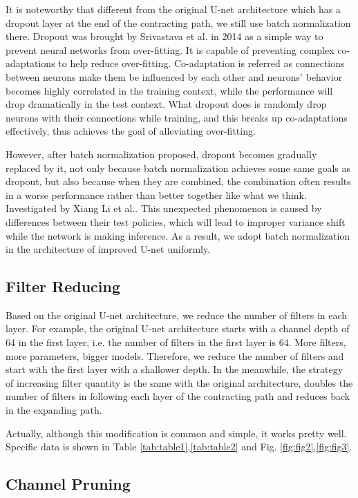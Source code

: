\documentclass[sigconf]{acmart}
\begin{document}
It is noteworthy that different from the original U-net architecture which has a dropout layer at the end of the contracting path, we still use batch normalization there. Dropout was brought by Srivastava et al. in 2014 \cite{dropout} as a simple way to prevent neural networks from over-fitting. It is capable of preventing complex co-adaptations to help reduce over-fitting. Co-adaptation is referred as connections between neurons make them be influenced by each other and neurons' behavior becomes highly correlated in the training context, while the performance will drop dramatically in the test context. What dropout does is randomly drop neurons with their connections while training, and this breaks up co-adaptations effectively, thus achieves the goal of alleviating over-fitting.

However, after batch normalization proposed, dropout becomes gradually replaced by it, not only because batch normalization achieves some same goals as dropout, but also because when they are combined, the combination often results in a worse performance rather than better together like what we think. Investigated by Xiang Li et al.\cite{disharmony}. This unexpected phenomenon is caused by differences between their test policies, which will lead to improper variance shift while the network is making inference. As a result, we adopt batch normalization in the architecture of improved U-net uniformly.

\subsection{Filter Reducing}
Based on the original U-net architecture, we reduce the number of filters in each layer. For example, the original U-net architecture starts with a channel depth of 64 in the first layer, i.e. the number of filters in the first layer is 64. More filters, more parameters, bigger models. Therefore, we reduce the number of filters and start with the first layer with a shallower depth. In the meanwhile, the strategy of increasing filter quantity is the same with the original architecture, doubles the number of filters in following each layer of the contracting path and reduces back in the expanding path. 

Actually, although this modification is common and simple, it works pretty well. Specific data is shown in Table \ref{tab:table1},\ref{tab:table2} and Fig. \ref{fig:fig2},\ref{fig:fig3}.

\subsection{Channel Pruning}
\end{document}
